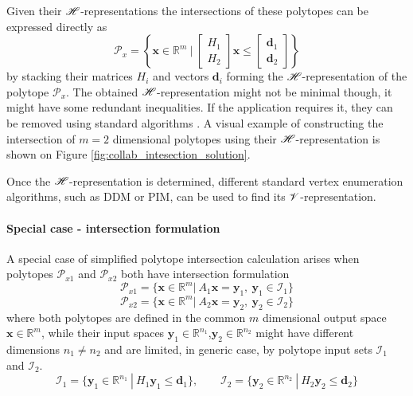 Given their $\mathscr{H}$-representations the intersections of these polytopes can be expressed directly as
\begin{equation}
    \mathcal{P}_x = \left\{\bm{x}\in\mathbb{R}^m ~\bigg|~ \begin{bmatrix}
        H_1\\
        H_2
    \end{bmatrix}\bm{x}\leq \begin{bmatrix}
        \bm{d}_1\\
        \bm{d}_2
    \end{bmatrix}\right\}
\end{equation}
by stacking their matrices $H_i$ and vectors $\bm{d}_i$ forming the $\mathscr{H}$-representation of the polytope $\mathcal{P}_x$. The obtained $\mathscr{H}$-representation might not be minimal though, it might have some redundant inequalities. If the application requires it, they can be removed using standard algorithms \cite{Paulraj2006}.
A visual example of constructing the intersection of $m=2$ dimensional polytopes using their $\mathscr{H}$-representation is shown on Figure \ref{fig:collab_intesection_solution}.

Once the $\mathscr{H}$-representation is determined, different standard vertex enumeration algorithms, such as DDM\cite{fukuda_dd} or PIM\cite{avis_pivoting_nodate}, can be used to find its $\mathscr{V}$-representation.

\paragraph*{Special case - intersection formulation}

A special case of simplified polytope intersection calculation arises when polytopes $\mathcal{P}_{x1}$ and $\mathcal{P}_{x2}$ both have intersection formulation
\begin{equation}
    \mathcal{P}_{x1}=\{\bm{x}\in\mathbb{R}^m |~ A_1\bm{x} = \bm{y}_1,~\bm{y}_1 \in \mathcal{I}_1  \}
\end{equation}
\begin{equation}
    \mathcal{P}_{x2}=\{\bm{x}\in\mathbb{R}^m |~ A_2\bm{x} = \bm{y}_2,~\bm{y}_2 \in \mathcal{I}_2  \}
\end{equation}
where both polytopes are defined in the common $m$ dimensional output space $\bm{x}\in\mathbb{R}^m$, while their input spaces $\bm{y}_1\in\mathbb{R}^{n_1}$,$\bm{y}_2\in\mathbb{R}^{n_2}$ might have different dimensions $n_1\neq n_2$ and are limited, in generic case, by polytope input sets $\mathcal{I}_1$ and $\mathcal{I}_2$.
\begin{equation}
    \mathcal{I}_{1}=\{\bm{y}_1\in\mathbb{R}^{n_1} ~|~ H_1\bm{y}_1 \leq \bm{d}_1\}, \qquad
    \mathcal{I}_{2}=\{\bm{y}_2\in\mathbb{R}^{n_2} ~|~ H_2\bm{y}_2 \leq \bm{d}_2\}
\end{equation}

